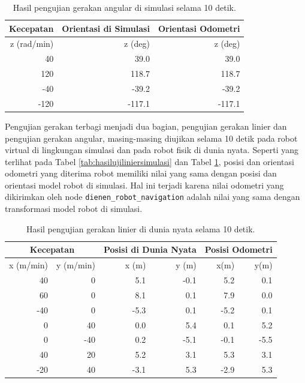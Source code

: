 \begin{table}
  \caption{Hasil pengujian gerakan angular di simulasi selama 10 detik.}
  \label{tab:hasilujiangularsimulasi}
  \centering
  \begin{tabular}{r|r|r}
    \toprule
    Kecepatan   & Orientasi di Simulasi & Orientasi Odometri \\
    \midrule
    z (rad/min) & z (deg)               & z (deg) \\
    \midrule
    40          & 39.0                  & 39.0 \\
    120         & 118.7                 & 118.7 \\
    -40         & -39.2                 & -39.2 \\
    -120        & -117.1                & -117.1 \\
    \bottomrule
  \end{tabular}
\end{table}

Pengujian gerakan terbagi menjadi dua bagian, pengujian gerakan linier dan pengujian gerakan angular, masing-masing diujikan selama 10 detik pada robot virtual di lingkungan simulasi dan pada robot fisik di dunia nyata.
Seperti yang terlihat pada Tabel \ref{tab:hasilujiliniersimulasi} dan Tabel \ref{tab:hasilujiangularsimulasi}, posisi dan orientasi odometri yang diterima robot memiliki nilai yang sama dengan posisi dan orientasi model robot di simulasi.
Hal ini terjadi karena nilai odometri yang dikirimkan oleh node \lstinline{dienen_robot_navigation} adalah nilai yang sama dengan transformasi model robot di simulasi.

\begin{table}
  \caption{Hasil pengujian gerakan linier di dunia nyata selama 10 detik.}
  \label{tab:hasilujilinierdunianyata}
  \centering
  \begin{tabular}{rr|rr|rr}
    \toprule
    \multicolumn{2}{c|}{Kecepatan} &
    \multicolumn{2}{|c|}{Posisi di Dunia Nyata} &
    \multicolumn{2}{|c}{Posisi Odometri} \\
    \midrule
    x (m/min) & y (m/min) & x (m) & y (m) & x(m)  & y(m) \\
    \midrule
    40        & 0         & 5.1   & -0.1  & 5.2   & 0.1 \\
    60        & 0         & 8.1   & 0.1   & 7.9   & 0.0 \\
    -40       & 0         & -5.3  & 0.1   & -5.2  & 0.1 \\
    0         & 40        & 0.0   & 5.4   & 0.1   & 5.2 \\
    0         & -40       & 0.2   & -5.1  & -0.1  & -5.5 \\
    40        & 20        & 5.2   & 3.1   & 5.3   & 3.1 \\
    -20       & 40        & -3.1  & 5.3   & -2.9  & 5.3 \\
    \bottomrule
  \end{tabular}
\end{table}

